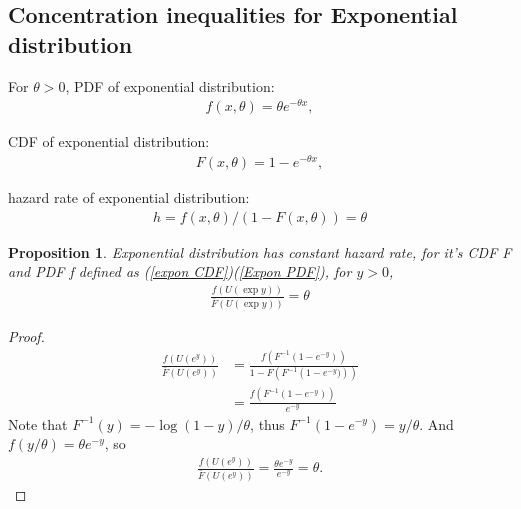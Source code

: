 \documentclass{article}
\theoremstyle{plain}
\newtheorem{prop}{Proposition}
\begin{document}
\subsection{Concentration inequalities for Exponential distribution}



For $\theta > 0$, PDF of exponential distribution:
\begin{align}
\label{Expon PDF}
    f(x, \theta) = \theta e^{-\theta x},
\end{align}

CDF of exponential distribution:
\begin{align}
\label{expon CDF}
    F(x, \theta) = 1 - e^{-\theta x},
\end{align}

hazard rate of exponential distribution:
\begin{align}
 h = f(x, \theta)/ (1-F(x, \theta)) = \theta
\end{align}


\begin{prop}
\label{prop for expon hazard rate}
Exponential distribution has constant hazard rate, for it's CDF F and PDF f defined as (\ref{expon CDF})(\ref{Expon PDF}), for $y > 0$,
\begin{align}
    \frac{f(U(\exp{y}))}{\bar{F}(U(\exp{y}))} = \theta
\end{align}
\end{prop}

\begin{proof}
\begin{align}
    \frac{f(U(e^{y}))}{\bar{F}(U(e^{y}))} &=
    \frac{f(F^{-1}(1 - e^{-y}))}{1-F\left({F}^{-1}\left(1 - e^{-y})\right)\right)}\\
    &= \frac{f(F^{-1}(1 - e^{-y}))}{e^{-y}}
\end{align}
Note that $F^{-1}(y) = - \log (1 - y)/ \theta$, thus $F^{-1}(1 - e^{-y}) = y/ \theta$. And $f(y/\theta) = \theta e^{-y}$,
so 
\begin{align}
    \frac{f(U(e^{y}))}{\bar{F}(U(e^{y}))} = \frac{\theta e^{-y}}{e^{-y}} = \theta.
\end{align}
 
\end{proof}
\end{document}
